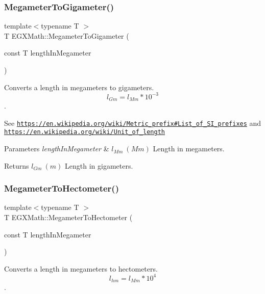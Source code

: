 \subsubsection{\texorpdfstring{Megameter\+To\+Gigameter()}{MegameterToGigameter()}}
{\footnotesize\ttfamily template$<$typename T $>$ \\
T E\+G\+X\+Math\+::\+Megameter\+To\+Gigameter (\begin{DoxyParamCaption}\item[{const T}]{length\+In\+Megameter }\end{DoxyParamCaption})}



Converts a length in megameters to gigameters. \[ l_{Gm}=l_{Mm} * 10^{-3} \]. 

See \href{https://en.wikipedia.org/wiki/Metric_prefix#List_of_SI_prefixes}{\tt https\+://en.\+wikipedia.\+org/wiki/\+Metric\+\_\+prefix\#\+List\+\_\+of\+\_\+\+S\+I\+\_\+prefixes} and \href{https://en.wikipedia.org/wiki/Unit_of_length}{\tt https\+://en.\+wikipedia.\+org/wiki/\+Unit\+\_\+of\+\_\+length} 
\begin{DoxyParams}{Parameters}
{\em length\+In\+Megameter} & $ l_{Mm}\ (Mm)$ Length in megameters. \\
\hline
\end{DoxyParams}
\begin{DoxyReturn}{Returns}
$ l_{Gm}\ (m)$ Length in gigameters. 
\end{DoxyReturn}
\mbox{\label{group___e_g_x_math-_conversions-_length_conversions-_megameter-_s_i_gad3460fd29fbb8232307cb7cb7265edce}} 
\subsubsection{\texorpdfstring{Megameter\+To\+Hectometer()}{MegameterToHectometer()}}
{\footnotesize\ttfamily template$<$typename T $>$ \\
T E\+G\+X\+Math\+::\+Megameter\+To\+Hectometer (\begin{DoxyParamCaption}\item[{const T}]{length\+In\+Megameter }\end{DoxyParamCaption})}



Converts a length in megameters to hectometers. \[ l_{hm}=l_{Mm} * 10^{4} \]. 

